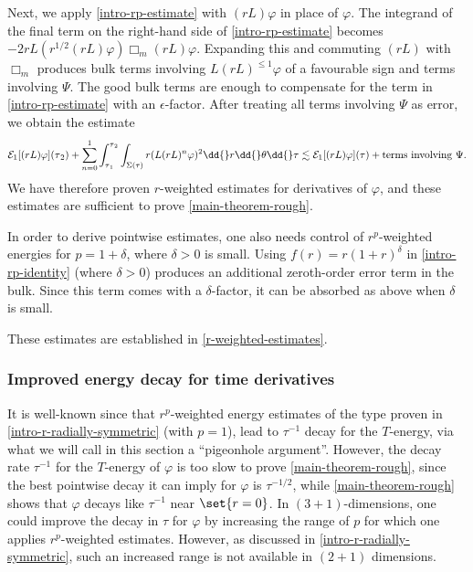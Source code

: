 \documentclass[10pt, reqno]{amsart}
\begin{document}
Next, we apply \cref{intro-rp-estimate} with \((rL)\varphi{}\) in place of \(\varphi{}\). The
integrand of the final term on the right-hand side of \cref{intro-rp-estimate}
becomes \(-2rL(r^{1/2}(rL)\varphi{})\Box_m(rL)\varphi{}\). Expanding this and
commuting \((rL)\) with \(\Box_m\) produces bulk terms involving \(L(rL)^{\le
1}\varphi{}\) of a favourable sign and terms involving \(\Psi{}\). The good bulk
terms are enough to compensate for the term in \cref{intro-rp-estimate} with an
\(\epsilon{}\)-factor. After treating all terms involving \(\Psi{}\) as error,
we obtain the estimate
\begin{equation}\label{intro-rp-rL-estimate}
\mathcal{E}_1[(rL)\varphi{}](\tau{}_2) + \sum_{n=0}^1\int_{\tau{}_1}^{\tau{}_2} \int _{\Sigma{}(\tau{})} r(L(rL)^n\varphi{})^2\dd{}r\dd{}\theta{}\dd{}\tau{} \lesssim \mathcal{E}_1[(rL)\varphi{}](\tau{}) + \textnormal{terms involving }\Psi{}.
\end{equation}
We have therefore proven \(r\)-weighted estimates for derivatives of \(\varphi{}\), and
these estimates are sufficient to prove \cref{main-theorem-rough}.
\begin{remark}
In order to derive pointwise estimates, one also needs control of
\(r^p\)-weighted energies for \(p = 1 + \delta{}\), where \(\delta{} > 0\) is
small. Using \(f(r) = r(1 + r)^\delta{}\) in \cref{intro-rp-identity} (where
\(\delta{} > 0\)) produces an additional zeroth-order error term in the bulk.
Since this term comes with a \(\delta{}\)-factor, it can be absorbed as above
when \(\delta{}\) is small.
\end{remark}
These estimates are established in \cref{r-weighted-estimates}.
\subsubsection{Improved energy decay for time derivatives}
\label{intro-energy-decay} It is well-known since \cite{rp-method} that
\(r^p\)-weighted energy estimates of the type proven in
\cref{intro-r-radially-symmetric} (with \(p = 1\)), lead to \(\tau^{-1}\) decay for
the \(T\)-energy, via what we will call in this section a ``pigeonhole argument''.
However, the decay rate \(\tau^{-1}\) for the \(T\)-energy of \(\varphi{}\) is
too slow to prove \cref{main-theorem-rough}, since the best pointwise decay it can
imply for \(\varphi{}\) is \(\tau^{-1/2}\), while \cref{main-theorem-rough} shows
that \(\varphi{}\) decays like \(\tau^{-1}\) near \(\set{r=0}\). In \((3 +
1)\)-dimensions, one could improve the decay in \(\tau{}\) for \(\varphi{}\) by
increasing the range of \(p\) for which one applies \(r^p\)-weighted estimates.
However, as discussed in \cref{intro-r-radially-symmetric}, such an increased range
is not available in \((2 + 1)\) dimensions.
\end{document}
